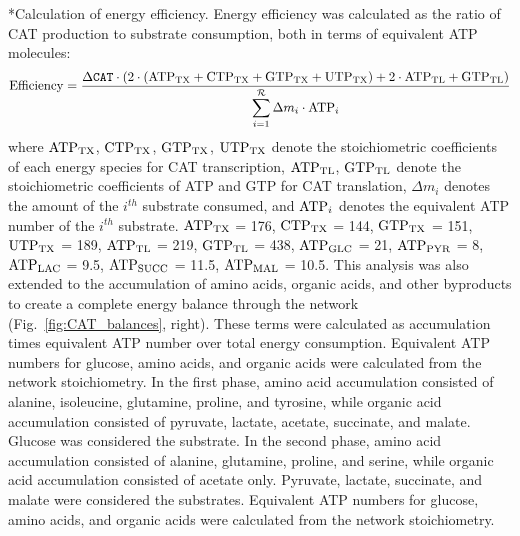 \documentclass[12pt]{article}
\makeatletter
\renewcommand\subsection{\@startsection
	{subsection}{2}{0mm}
	{-0.05in}
	{-0.5\baselineskip}
	{\normalfont\normalsize\bfseries}}
\makeatother
\begin{document}
\subsection*{Calculation of energy efficiency.}
Energy efficiency was calculated as the ratio of CAT production to substrate consumption, both in terms of equivalent ATP molecules:
\begin{equation}\label{eqn:energy-efficiency-definition}
	{\rm Efficiency}=\frac{\Delta\texttt{CAT}\cdot \left(2\cdot\left(\rm {ATP}_{TX}+\rm {CTP}_{TX}+\rm {GTP}_{TX}+\rm {UTP}_{TX}\right)+\rm2\cdot\rm {ATP}_{TL}+\rm {GTP}_{TL}\right)}{\displaystyle\sum_{i=1}^{\mathcal{R}}\Delta m_{i}\cdot {\rm ATP}_i}
\end{equation}
where $\rm {ATP}_{TX}$, $\rm {CTP}_{TX}$, $\rm {GTP}_{TX}$, $\rm {UTP}_{TX}$ denote the stoichiometric coefficients of each energy species for CAT transcription, $\rm {ATP}_{TL}$, $\rm {GTP}_{TL}$ denote the stoichiometric coefficients of ATP and GTP for CAT translation, $\Delta m_{i}$ denotes the amount of the $i^{th}$ substrate consumed, and ${\rm ATP}_i$ denotes the equivalent ATP number of the $i^{th}$ substrate.
$\rm {ATP}_{TX}$ = 176, $\rm {CTP}_{TX}$ = 144, $\rm {GTP}_{TX}$ = 151, $\rm {UTP}_{TX}$ = 189, $\rm {ATP}_{TL}$ = 219, $\rm {GTP}_{TL}$ = 438, $\rm {ATP}_{GLC}$ = 21, $\rm {ATP}_{PYR}$ = 8, $\rm {ATP}_{LAC}$ = 9.5, $\rm {ATP}_{SUCC}$ = 11.5, $\rm {ATP}_{MAL}$ = 10.5.
This analysis was also extended to the accumulation of amino acids, organic acids, and other byproducts to create a complete energy balance through the network (Fig.~\ref{fig:CAT_balances}, right).
These terms were calculated as accumulation times equivalent ATP number over total energy consumption.
Equivalent ATP numbers for glucose, amino acids, and organic acids were calculated from the network stoichiometry.
In the first phase, amino acid accumulation consisted of alanine, isoleucine, glutamine, proline, and tyrosine, while organic acid accumulation consisted of pyruvate, lactate, acetate, succinate, and malate.
Glucose was considered the substrate.
In the second phase, amino acid accumulation consisted of alanine, glutamine, proline, and serine, while organic acid accumulation consisted of acetate only.
Pyruvate, lactate, succinate, and malate were considered the substrates.
Equivalent ATP numbers for glucose, amino acids, and organic acids were calculated from the network stoichiometry.
\end{document}
